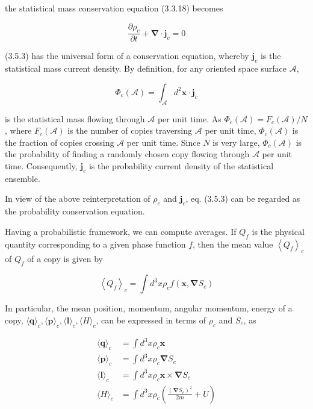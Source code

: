 \documentclass{article}
\begin{document}
the statistical mass conservation equation (3.3.18) becomes
 
\begin{equation*}
\frac{\partial \rho_{c}}{\partial t}+\boldsymbol{\nabla} \cdot \boldsymbol{j}_{c}=0 \tag{3.5.3}
\end{equation*}
 
(3.5.3) has the universal form of a conservation equation, whereby $\boldsymbol{j}_{c}$ is the statistical mass current density. By definition, for any oriented space surface $\mathcal{A}$,
 
\begin{equation*}
\Phi_{c}(\mathcal{A})=\int_{\mathcal{A}} d^{2} \boldsymbol{x} \cdot \boldsymbol{j}_{c} \tag{3.5.4}
\end{equation*}
 
is the statistical mass flowing through $\mathcal{A}$ per unit time. As $\Phi_{c}(\mathcal{A})=F_{c}(\mathcal{A}) / N$, where $F_{c}(\mathcal{A})$ is the number of copies traversing $\mathcal{A}$ per unit time, $\Phi_{c}(\mathcal{A})$ is the fraction of copies crossing $\mathcal{A}$ per unit time. Since $N$ is very large,
$\Phi_{c}(\mathcal{A})$ is the probability of finding a randomly chosen copy flowing through $\mathcal{A}$ per unit time. Consequently, $\boldsymbol{j}_{c}$ is the probability current density of the statistical ensemble.

In view of the above reinterpretation of $\rho_{c}$ and $\boldsymbol{j}_{c}$, eq. (3.5.3) can be regarded as the probability conservation equation.

Having a probabilistic framework, we can compute averages. If $Q_{f}$ is the physical quantity corresponding to a given phase function $f$, then the mean value $\left\langle Q_{f}\right\rangle_{c}$ of $Q_{f}$ of a copy is given by
 
\begin{equation*}
\left\langle Q_{f}\right\rangle_{c}=\int d^{3} x \rho_{c} f\left(\boldsymbol{x}, \boldsymbol{\nabla} S_{c}\right) \tag{3.5.5}
\end{equation*}
 

In particular, the mean position, momentum, angular momentum, energy of a copy, $\langle\boldsymbol{q}\rangle_{c},\langle\boldsymbol{p}\rangle_{c},\langle\boldsymbol{l}\rangle_{c},\langle H\rangle_{c}$, can be expressed in terms of $\rho_{c}$ and $S_{c}$, as
 
\begin{align*}
\langle\boldsymbol{q}\rangle_{c} & =\int d^{3} x \rho_{c} \boldsymbol{x}  \tag{3.5.6}\\
\langle\boldsymbol{p}\rangle_{c} & =\int d^{3} x \rho_{c} \boldsymbol{\nabla} S_{c}  \tag{3.5.7}\\
\langle\boldsymbol{l}\rangle_{c} & =\int d^{3} x \rho_{c} \boldsymbol{x} \times \boldsymbol{\nabla} S_{c}  \tag{3.5.8}\\
\langle H\rangle_{c} & =\int d^{3} x \rho_{c}\left(\frac{\left(\boldsymbol{\nabla} S_{c}\right)^{2}}{2 m}+U\right) \tag{3.5.9}
\end{align*}
 
\end{document}
